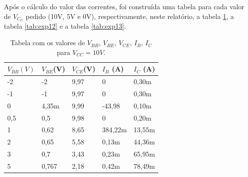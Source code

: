 \documentclass{abntex2}
\begin{document}
Após o cálculo do valor das correntes, foi construída uma tabela para cada valor de $V_C_C$ pedido
(10V, 5V e 0V), respectivamente, neste relatório, a tabela \ref{tab:exp11}, a tabela \ref{tab:exp12} e a tabela \ref{tab:exp13}.

\begin{table}[h]
\centering
\begin{tabular}{|l|l|l|l|l|}
\hline
$V_{BB}(V)$ & $V_{BE}$(V) & $V_{CE}$(V) & $I_B$ (A) & $I_C$ (A) \\
\hline
-2        & -2      & 9,97                              & 0             & 0,30m                  \\
\hline
-1         & -1      &  9,97                          & 0             & 0,30m                  \\
\hline
0           & 4,35m      & 9,99                           & -43,98             & 0,10m                  \\
\hline
0,5        & 0,5      & 9,98                           & 0             & 0,20m                  \\
\hline
1         & 0,62      & 8,65                           & 384,22m             & 13,55m                  \\
\hline
2         & 0,65      & 5,58                           & 0,13m             & 44,36m                  \\
\hline
3         & 0,7      & 3,43                          & 0,23m             & 65,95m                  \\
\hline
5         & 0,767      & 2,18                           & 0,42m             & 78,49m                  \\
\hline
\end{tabular}
\caption{Tabela com os valores de $V_{BB}$, $V_{BE}$, $V_{CE}$, $I_B$, $I_C$ para $V_{CC} = 10V$.}
\label{tab:exp11}
\end{table}
\end{document}
